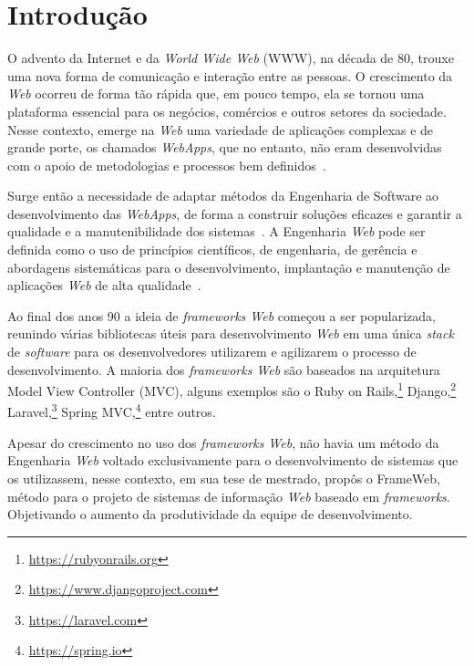 \chapter{Introdução}
\label{chap-intro}

O advento da Internet e da \textit{World Wide Web} (WWW), na década de 80, trouxe uma nova
forma de comunicação e interação entre as pessoas. O crescimento da \textit{Web} ocorreu de forma tão
rápida que, em pouco tempo, ela se tornou uma plataforma essencial para os negócios, comércios
e outros setores da sociedade. Nesse contexto, emerge na \textit{Web} uma variedade de aplicações
complexas e de grande porte, os chamados \textit{WebApps}, que no entanto, não eram desenvolvidas com o apoio de
metodologias e processos bem definidos~\cite{murugesan:2001}.


Surge então a necessidade de adaptar métodos da Engenharia de Software ao desenvolvimento
das \textit{WebApps}, de forma a construir soluções eficazes e garantir a qualidade e a manutenibilidade 
dos sistemas~\cite{beder:2017}. A Engenharia \textit{Web} pode ser definida como o uso de 
princípios científicos, de engenharia, de gerência e abordagens sistemáticas para o desenvolvimento,
implantação e manutenção de aplicações \textit{Web} de alta qualidade~\cite{murugesan:2001}.

Ao final dos anos 90 a ideia de \textit{frameworks Web} começou a ser popularizada, reunindo 
várias bibliotecas úteis para desenvolvimento \textit{Web} em uma única \textit{stack} de \textit{software}
para os desenvolvedores utilizarem e agilizarem o processo de desenvolvimento. A maioria dos
\textit{frameworks Web} são baseados na arquitetura Model View Controller (MVC), alguns exemplos
são o Ruby on Rails,\footnote{\url{https://rubyonrails.org}} Django,\footnote{\url{https://www.djangoproject.com}} 
Laravel,\footnote{\url{https://laravel.com}} Spring MVC,\footnote{\url{https://spring.io}} entre outros.

Apesar do crescimento no uso dos \textit{frameworks Web}, não havia um método da Engenharia \textit{Web} 
voltado exclusivamente para o desenvolvimento de sistemas que os utilizassem, nesse contexto, em sua 
tese de mestrado,  propôs o FrameWeb, método para o projeto de sistemas de 
informação \textit{Web} baseado em \textit{frameworks}. Objetivando o aumento da produtividade da 
equipe de desenvolvimento.

